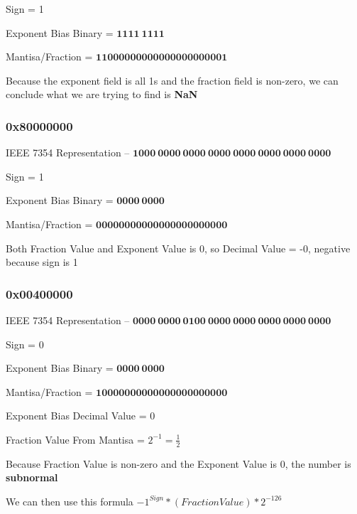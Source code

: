 \documentclass{article}
\newcommand{\boxedanswer}[1]{%

    \fbox{\large\textbf{#1}}%
}
\begin{document}
    Sign = 1

    Exponent Bias Binary = $\mathbf{1111\: 1111}$

    Mantisa/Fraction = $\mathbf{110 0000 0000 0000 0000 0001}$

    Because the exponent field is all 1s and the fraction field is non-zero, we can conclude what we are trying to find is \textbf{NaN}

    \vspace*{0.1in}

    \boxedanswer{NaN(Not a Number)}

    \subsubsection*{0x80000000}

    IEEE 7354 Representation -- $\mathbf{1000\:0000\:0000\:0000\:0000\:0000\:0000\:0000}$

    Sign = 1

    Exponent Bias Binary = $\mathbf{0000\:0000}$

    Mantisa/Fraction = $\mathbf{00000000000000000000000}$

    Both Fraction Value and Exponent Value is 0, so Decimal Value = -0, negative because sign is 1

    \vspace*{0.1in}

    \boxedanswer{-0}

    \newpage

    \subsubsection*{0x00400000}

    IEEE 7354 Representation -- $\mathbf{0000\: 0000\: 0100\: 0000\:0000\:0000\:0000\:0000}$

    Sign = 0

    Exponent Bias Binary = $\mathbf{0000\:0000}$

    Mantisa/Fraction = $\mathbf{10000000000000000000000}$

    Exponent Bias Decimal Value = 0

    Fraction Value From Mantisa = $2^{-1} = \frac{1}{2}$

    Because Fraction Value is non-zero and the Exponent Value is 0, the number is \textbf{subnormal}

    We can then use this formula \hspace*{0.2in} $-1^{Sign} * (Fraction Value) * 2^{-126}$
\end{document}
